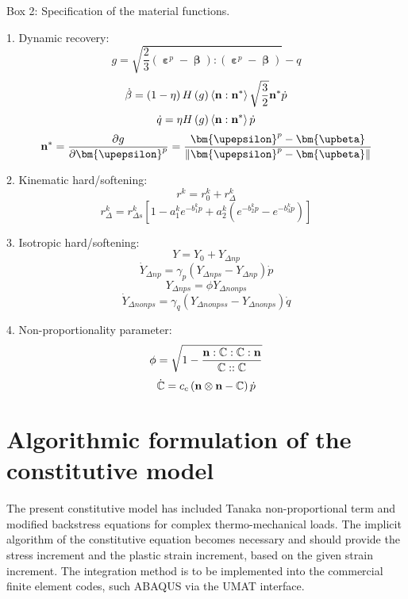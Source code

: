 \begin{framed}
\label{Box:1}
Box 2: Specification of the material functions.

1. Dynamic recovery:
\[g = \sqrt {\frac{2}{3}\left( {{{\bm{\upepsilon }}^p} - {\bm{\upbeta}}} \right):\left( {{{\bm{\upepsilon }}^p} - {\bm{\upbeta}}} \right)}  - q\]
\[\dot \beta  = \left( {1 - \eta } \right)H\left( g \right)\left\langle {{\bf{n}}:{{\bf{n}}^*}} \right\rangle \sqrt {\frac{3}{2}} {{\bf{n}}^*}\dot p\]
\[\dot q = \eta H\left( g \right)\left\langle {{\bf{n}}:{{\bf{n}}^*}} \right\rangle \dot p\]
\[{{\bf{n}}^*} = \frac{{\partial g}}{{\partial {{\bm{\upepsilon }}^p}}} = \frac{{{{\bm{\upepsilon }}^p} - {\bm{\upbeta}}}}{{\left\| {{{\bm{\upepsilon }}^p} - {\bm{\upbeta}}} \right\|}}\]

2. Kinematic hard/softening:
\[{r^k} = r_0^k + r_\Delta ^k\]
\[r_\Delta ^k = r_{\Delta s}^k\left[ {1 - a_1^k{e^{ - b_1^kp}} + a_2^k({e^{ - b_2^kp}} - {e^{ - b_3^kp}})} \right]\]

3. Isotropic hard/softening:
\[Y = {Y_0} + {Y_{\Delta np}}\]
\[{\dot Y_{\Delta np}} = {\gamma _p}\left( {{Y_{\Delta nps}} - {Y_{\Delta np}}} \right)\dot p\]
\[{Y_{\Delta nps}} = \phi {Y_{\Delta nonps}}\]
\[{\dot Y_{\Delta nonps}} = {\gamma _q}\left( {{Y_{\Delta nonpss}} - {Y_{\Delta nonps}}} \right)\dot q\]


4. Non-proportionality parameter:
\[\phi  = \sqrt {1 - \frac{{{\bf{n}}:\mathbb{C}:\mathbb{C}:{\bf{n}}}}{{\mathbb{C}::\mathbb{C}}}} \]
\[\dot {\mathbb{C}} = {c_c}\left( {{\bf{n}} \otimes {\bf{n}} - \mathbb{C}} \right)\dot p\]

\end{framed}

\section{Algorithmic formulation of the constitutive model}
The present constitutive model has included Tanaka non-proportional term and modified backstress equations for complex thermo-mechanical loads. The implicit algorithm of the constitutive equation becomes necessary and should provide the stress increment and the plastic strain increment, based on the given strain increment. The integration method is to be implemented into the commercial finite element codes, such ABAQUS via the UMAT interface.

